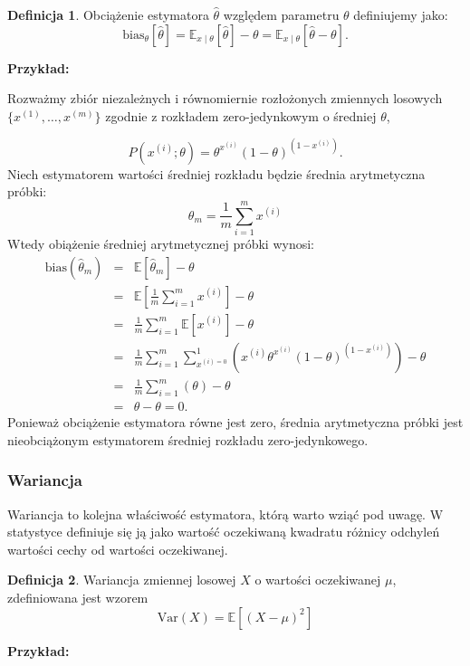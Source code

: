 \documentclass[11pt]{book}
\theoremstyle{definition}
\newtheorem{definition}{Definicja}[section]
\begin{document}
\begin{definition}
Obciążenie estymatora $\hat{\theta}$ względem parametru $\theta$ definiujemy jako:
	\begin{equation}
	\text{bias}_{\theta}\left[\hat{\theta}\right] = \mathbb{E}_{x \mid \theta }\left[\hat{\theta}\right] - \theta = \mathbb{E}_{x\mid \theta} \left[\hat{\theta}-\theta\right].
	\end{equation}
	
\end{definition}
%
\noindent\textbf{Przykład:} 

\noindent Rozważmy zbiór niezależnych i równomiernie rozłożonych zmiennych losowych $\{{ x^{(1)}, \dots, x^{(m)} }\}$ zgodnie z rozkładem zero-jedynkowym o średniej $\theta$,

\begin{equation}
P(x^{(i)};\theta) = \theta^{x^{(i)}} \left( 1-\theta \right)^{(1-x^{(i)})}.
\end{equation}
%
Niech estymatorem wartości średniej rozkładu będzie średnia arytmetyczna próbki:
\begin{equation}
\theta_m = \frac{1}{m} \sum_{i=1}^m x^{(i)}
\end{equation}
Wtedy obiążenie średniej arytmetycznej próbki wynosi:
\begin{eqnarray}
\text{bias}\left(\hat{\theta}_m\right) &=& \mathbb{E} \left[\hat{\theta}_m \right] - \theta \nonumber \\
&=& \mathbb{E} \left[\frac{1}{m} \sum_{i=1}^m x^{(i)} \right] - \theta\nonumber \\
&=& \frac{1}{m} \sum_{i=1}^{m} \mathbb{E} \left[x^{(i)} \right] - \theta \nonumber \\
&=& \frac{1}{m} \sum_{i=1}^{m} \sum_{x^{(i)=0}}^{1} \left(x^{(i)}\theta^{x^{(i)}} (1-\theta)^{(1-x^{(i)})}\right) - \theta \nonumber \\
&=&  \frac{1}{m} \sum_{i=1}^{m} \left(\theta\right) - \theta \nonumber \\
&=& \theta - \theta = 0.
\end{eqnarray}
%
Ponieważ obciążenie estymatora równe jest zero, średnia arytmetyczna próbki jest nieobciążonym estymatorem średniej rozkładu zero-jedynkowego.


\subsubsection{Wariancja}

Wariancja to kolejna właściwość estymatora, którą warto wziąć pod uwagę. W statystyce definiuje się ją jako wartość oczekiwaną kwadratu różnicy odchyleń wartości cechy od wartości oczekiwanej. 
%
\begin{definition}
Wariancja zmiennej losowej $X$ o wartości oczekiwanej $\mu$, zdefiniowana jest wzorem
\begin{equation}
\text{Var}(X) = \mathbb{E} \left[ \left(X - \mu \right)^2 \right]
\end{equation}
\end{definition}
\noindent\textbf{Przykład:} 
\end{document}
